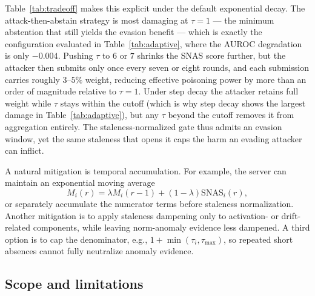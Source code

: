 \documentclass[pdflatex,sn-mathphys-num]{sn-jnl}
\begin{document}
Table~\ref{tab:tradeoff} makes this explicit under the default exponential decay. The attack-then-abstain strategy is most damaging at $\tau=1$ --- the minimum abstention that still yields the evasion benefit --- which is exactly the configuration evaluated in Table~\ref{tab:adaptive}, where the AUROC degradation is only $-0.004$. Pushing $\tau$ to $6$ or $7$ shrinks the SNAS score further, but the attacker then submits only once every seven or eight rounds, and each submission carries roughly $3$--$5\%$ weight, reducing effective poisoning power by more than an order of magnitude relative to $\tau=1$. Under step decay the attacker retains full weight while $\tau$ stays within the cutoff (which is why step decay shows the largest damage in Table~\ref{tab:adaptive}), but any $\tau$ beyond the cutoff removes it from aggregation entirely. The staleness-normalized gate thus admits an evasion window, yet the same staleness that opens it caps the harm an evading attacker can inflict.

A natural mitigation is temporal accumulation. For example, the server can maintain an exponential moving average
\begin{equation}
    M_i(r) = \lambda M_i(r-1) + (1-\lambda)\mathrm{SNAS}_i(r),
\end{equation}
or separately accumulate the numerator terms before staleness normalization. Another mitigation is to apply staleness dampening only to activation- or drift-related components, while leaving norm-anomaly evidence less dampened. A third option is to cap the denominator, e.g., $1+\min(\tau_i,\tau_{\max})$, so repeated short absences cannot fully neutralize anomaly evidence.

\subsection{Scope and limitations}\label{sec:limitations}
\end{document}
